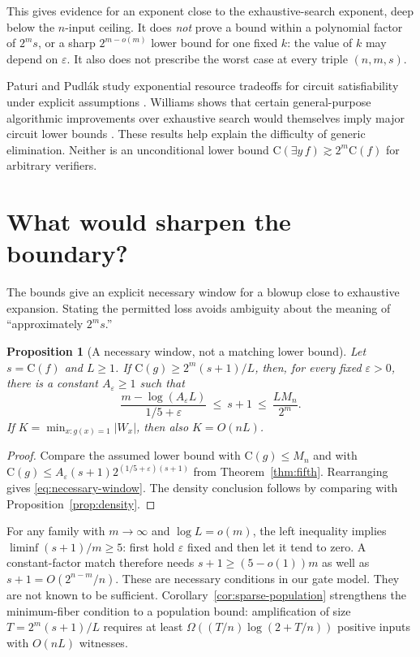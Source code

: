 \documentclass[11pt]{article}
\newtheorem{proposition}[theorem]{Proposition}
\theoremstyle{definition}
\theoremstyle{remark}
\newcommand{\C}{\mathrm{C}}
\begin{document}
This gives evidence for an exponent close to the exhaustive-search
exponent, deep below the $n$-input ceiling. It does \emph{not} prove
a bound within a polynomial factor of $2^m s$, or a sharp
$2^{m-o(m)}$ lower bound for one fixed $k$: the value of $k$ may
depend on $\varepsilon$. It also does not prescribe the worst case
at every triple $(n,m,s)$.

Paturi and Pudl\'ak study exponential resource tradeoffs for circuit
satisfiability under explicit assumptions \citep{PaturiPudlak2010}.
Williams shows that certain general-purpose algorithmic improvements
over exhaustive search would themselves imply major circuit lower
bounds \citep{Williams2010}. These results help explain the difficulty
of generic elimination. Neither is an unconditional lower bound
$\C(\exists y\,f)\gtrsim2^m\C(f)$ for arbitrary verifiers.



\section{What would sharpen the boundary?}

The bounds give an explicit necessary window for a blowup close to
exhaustive expansion. Stating the permitted loss avoids ambiguity
about the meaning of ``approximately $2^m s$.''

\begin{proposition}[A necessary window, not a matching lower bound]
Let $s=\C(f)$ and $L\ge1$. If
$\C(g)\ge2^m(s+1)/L$, then, for every fixed $\varepsilon>0$,
there is a constant $A_\varepsilon\ge1$ such that
\begin{equation}\label{eq:necessary-window}
 \boxed{\qquad
 \frac{m-\log(A_\varepsilon L)}{1/5+\varepsilon}
 \ \le\ s+1\ \le\ \frac{LM_n}{2^m}.
 \qquad}
\end{equation}
If $K=\min_{x:g(x)=1}|W_x|$, then also $K=O(nL)$.
\end{proposition}
\begin{proof}
Compare the assumed lower bound with $\C(g)\le M_n$ and with
$\C(g)\le A_\varepsilon(s+1)2^{(1/5+\varepsilon)(s+1)}$ from
Theorem~\ref{thm:fifth}. Rearranging gives
\eqref{eq:necessary-window}. The density conclusion follows by
comparing with Proposition~\ref{prop:density}.
\end{proof}

For any family with $m\to\infty$ and $\log L=o(m)$, the left
inequality implies $\liminf(s+1)/m\ge5$: first hold $\varepsilon$
fixed and then let it tend to zero. A constant-factor match therefore
needs $s+1\ge(5-o(1))m$ as well as $s+1=O(2^{n-m}/n)$.
These are necessary conditions in our gate model. They are not known
to be sufficient. Corollary~\ref{cor:sparse-population} strengthens the
minimum-fiber condition to a population bound: amplification of size
$T=2^m(s+1)/L$ requires at least
$\Omega((T/n)\log(2+T/n))$ positive inputs with $O(nL)$ witnesses.
\end{document}
